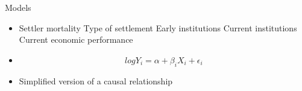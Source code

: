 \documentclass{beamer}
\begin{document}
\begin{frame}{Models}
    \begin{itemize}[<+- | alert@+>]

        \item Settler mortality \textrightarrow Type of settlement
        \textrightarrow Early institutions \textrightarrow Current institutions
        \textrightarrow Current economic performance

        \item \begin{equation}
            log Y_{i}=\alpha+\beta_{i}X_{i}+\epsilon_{i}
        \end{equation}

	\item Simplified version of a causal relationship 

    \end{itemize}
\end{frame}{}
\end{document}
